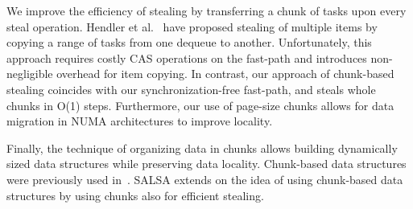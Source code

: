 We improve the efficiency of stealing by transferring a chunk of tasks upon every steal
operation. Hendler et al.~\cite{Hendler:2002:NSW:571825.571876} have proposed stealing of multiple
items by copying a range of tasks from one dequeue to another. Unfortunately, this approach requires
costly CAS operations on the fast-path and introduces non-negligible overhead for item copying. In
contrast, our approach of chunk-based stealing coincides with our synchronization-free fast-path,
and steals whole chunks in O(1) steps. Furthermore, our use of page-size chunks allows for data
migration in NUMA architectures to improve locality.

Finally, the technique of organizing data in chunks allows building dynamically sized data
structures while preserving data locality. Chunk-based data structures were previously used
in~\cite{Braginsky:2011:LLL:1946143.1946153, Gidenstam:2010:CLQ:1940234.1940266,
Hendler:2006:DNW:1160290.1160294, Sundell:2011:LAC:1989493.1989550}. SALSA extends on the idea of
using chunk-based data structures by using chunks also for efficient stealing.

